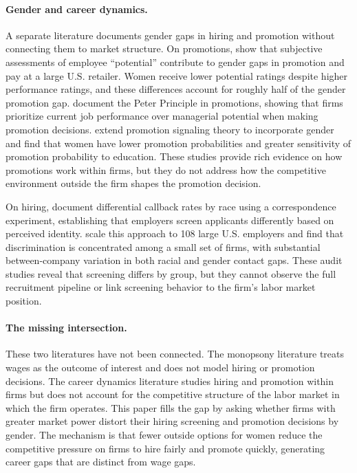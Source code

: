 \documentclass[11pt]{article}
\begin{document}
\paragraph{Gender and career dynamics.}
A separate literature documents gender gaps in hiring and promotion without connecting them to market structure. On promotions, \citet{benson_potential_2026} show that subjective assessments of employee ``potential'' contribute to gender gaps in promotion and pay at a large U.S. retailer. Women receive lower potential ratings despite higher performance ratings, and these differences account for roughly half of the gender promotion gap. \citet{benson_promotions_2019} document the Peter Principle in promotions, showing that firms prioritize current job performance over managerial potential when making promotion decisions. \citet{cassidy_promotion_2016} extend promotion signaling theory to incorporate gender and find that women have lower promotion probabilities and greater sensitivity of promotion probability to education. These studies provide rich evidence on how promotions work within firms, but they do not address how the competitive environment outside the firm shapes the promotion decision.

On hiring, \citet{bertrand_are_2004} document differential callback rates by race using a correspondence experiment, establishing that employers screen applicants differently based on perceived identity. \citet{kline_systemic_2022} scale this approach to 108 large U.S. employers and find that discrimination is concentrated among a small set of firms, with substantial between-company variation in both racial and gender contact gaps. These audit studies reveal that screening differs by group, but they cannot observe the full recruitment pipeline or link screening behavior to the firm's labor market position.


\paragraph{The missing intersection.}
These two literatures have not been connected. The monopsony literature treats wages as the outcome of interest and does not model hiring or promotion decisions. The career dynamics literature studies hiring and promotion within firms but does not account for the competitive structure of the labor market in which the firm operates. This paper fills the gap by asking whether firms with greater market power distort their hiring screening and promotion decisions by gender. The mechanism is that fewer outside options for women reduce the competitive pressure on firms to hire fairly and promote quickly, generating career gaps that are distinct from wage gaps.
\end{document}
